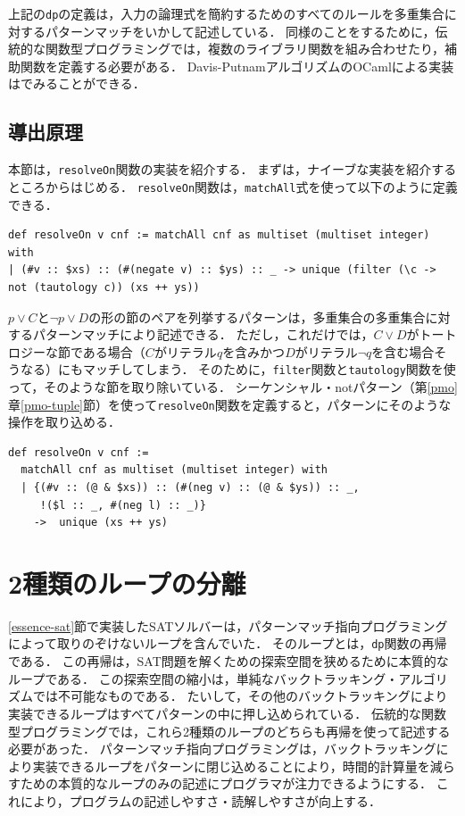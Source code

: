 上記の\lstinline{dp}の定義は，入力の論理式を簡約するためのすべてのルールを多重集合に対するパターンマッチをいかして記述している．
同様のことをするために，伝統的な関数型プログラミングでは，複数のライブラリ関数を組み合わせたり，補助関数を定義する必要がある．
Davis-PutnamアルゴリズムのOCamlによる実装は\cite{harrison2009handbook}でみることができる．

\subsection{導出原理}

本節は，\lstinline{resolveOn}関数の実装を紹介する．
まずは，ナイーブな実装を紹介するところからはじめる．
\lstinline{resolveOn}関数は，\lstinline{matchAll}式を使って以下のように定義できる．
\begin{lstlisting}[language=egison,numbers=none]
def resolveOn v cnf := matchAll cnf as multiset (multiset integer) with
| (#v :: $xs) :: (#(negate v) :: $ys) :: _ -> unique (filter (\c -> not (tautology c)) (xs ++ ys))
\end{lstlisting}
$p \lor C$と$\neg p \lor D$の形の節のペアを列挙するパターンは，多重集合の多重集合に対するパターンマッチにより記述できる．
ただし，これだけでは，$C \lor D$がトートロジーな節である場合（$C$がリテラル$q$を含みかつ$D$がリテラル$\neg q$を含む場合そうなる）にもマッチしてしまう．
そのために，\lstinline{filter}関数と\lstinline{tautology}関数を使って，そのような節を取り除いている．
シーケンシャル・notパターン（第\ref{pmo}章\ref{pmo-tuple}節）を使って\lstinline{resolveOn}関数を定義すると，パターンにそのような操作を取り込める．
\begin{lstlisting}[language=egison,numbers=none]
def resolveOn v cnf :=
  matchAll cnf as multiset (multiset integer) with
  | {(#v :: (@ & $xs)) :: (#(neg v) :: (@ & $ys)) :: _,
     !($l :: _, #(neg l) :: _)}
    ->  unique (xs ++ ys)
\end{lstlisting}

\section{2種類のループの分離}\label{essence-pmo}

\ref{essence-sat}節で実装したSATソルバーは，パターンマッチ指向プログラミングによって取りのぞけないループを含んでいた．
そのループとは，\lstinline{dp}関数の再帰である．
この再帰は，SAT問題を解くための探索空間を狭めるために本質的なループである．
この探索空間の縮小は，単純なバックトラッキング・アルゴリズムでは不可能なものである．
たいして，その他のバックトラッキングにより実装できるループはすべてパターンの中に押し込められている．
伝統的な関数型プログラミングでは，これら2種類のループのどちらも再帰を使って記述する必要があった．
パターンマッチ指向プログラミングは，バックトラッキングにより実装できるループをパターンに閉じ込めることにより，時間的計算量を減らすための本質的なループのみの記述にプログラマが注力できるようにする．
これにより，プログラムの記述しやすさ・読解しやすさが向上する．


